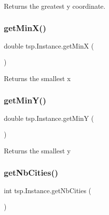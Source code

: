 \begin{DoxyReturn}{Returns}
the greatest y coordinate. 
\end{DoxyReturn}
\mbox{\label{classtsp_1_1_instance_af3a908c0ce382a0a0dcac8442b4dc45c}} 
\subsubsection{\texorpdfstring{get\+Min\+X()}{getMinX()}}
{\footnotesize\ttfamily double tsp.\+Instance.\+get\+MinX (\begin{DoxyParamCaption}{ }\end{DoxyParamCaption})\hspace{0.3cm}{\ttfamily [inline]}}

\begin{DoxyReturn}{Returns}
the smallest x 
\end{DoxyReturn}
\mbox{\label{classtsp_1_1_instance_a2cb9f47796458eb11d04c57ba4aefec6}} 
\subsubsection{\texorpdfstring{get\+Min\+Y()}{getMinY()}}
{\footnotesize\ttfamily double tsp.\+Instance.\+get\+MinY (\begin{DoxyParamCaption}{ }\end{DoxyParamCaption})\hspace{0.3cm}{\ttfamily [inline]}}

\begin{DoxyReturn}{Returns}
the smallest y 
\end{DoxyReturn}
\mbox{\label{classtsp_1_1_instance_ad7b27560e9d3b5fff61cfb3056bdb3af}} 
\subsubsection{\texorpdfstring{get\+Nb\+Cities()}{getNbCities()}}
{\footnotesize\ttfamily int tsp.\+Instance.\+get\+Nb\+Cities (\begin{DoxyParamCaption}{ }\end{DoxyParamCaption})\hspace{0.3cm}{\ttfamily [inline]}}

